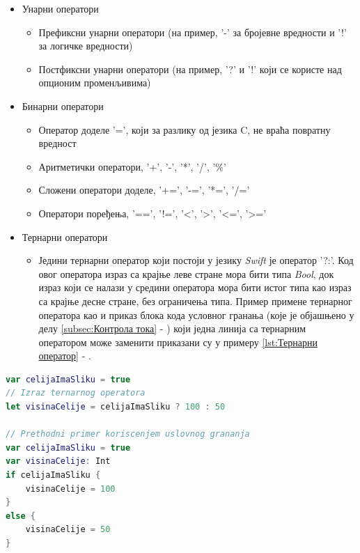 \documentclass[12pt,oneside]{memoir}
\begin{document}
\begin{itemize}
  \item Унарни оператори
  
\begin{itemize}
    \item Префиксни унарни оператори (на пример, '-' за бројевне вредности и '!' за логичке вредности)  
    \item Постфиксни унарни оператори (на пример, '?' и '!' који се користе над опционим променљивима)
\end{itemize}
  
  \item Бинарни оператори
  
\begin{itemize}
    \item Оператор доделе '=', који за разлику од језика C, не враћа повратну вредност  
    \item Аритметички оператори, '+', '-', '*', '/', '\%'
    \item Сложени оператори доделе, '+=', '-=', '*=', '/='
    \item Оператори поређења, '==', '!=', '<', '>', '<=', '>='
\end{itemize}
 
  \item Тернарни оператори

\begin{itemize}
    \item Једини тернарни оператор који постоји у језику \textit{Swift} је оператор '?:'. Код овог оператора израз са крајње леве стране мора бити типа \textit{Bool}, док израз
    који се налази у средини оператора мора бити истог типа као израз са крајње
    десне стране, без ограничења типа. Пример примене тернарног оператора
    као и приказ блока кода условног гранања (које је објашњено у делу \ref{subsec:Контрола тока} - ) који једна линија са тернарним оператором може заменити приказани су у примеру \ref{lst:Тернарни оператор} - .
  
\end{itemize}

\end{itemize}

\begin{lstlisting}[caption=\textit{{Тернарни оператор}}, label={lst:Тернарни оператор}, language=Swift, frame=single]
var celijaImaSliku = true
// Izraz ternarnog operatora
let visinaCelije = celijaImaSliku ? 100 : 50

// Prethodni primer koriscenjem uslovnog grananja
var celijaImaSliku = true
var visinaCelije: Int
if celijaImaSliku {
    visinaCelije = 100
}
else {
    visinaCelije = 50
}
\end{lstlisting}
\end{document}
